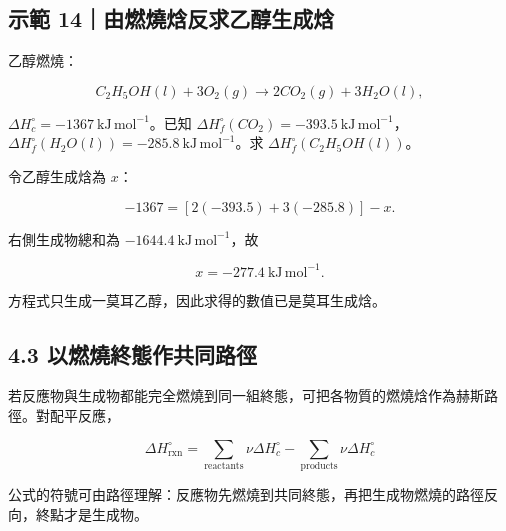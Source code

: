 \documentclass[11pt,a4paper]{article}
\begin{document}
\begin{HandoutWorkedExample}

\subsection{示範 14｜由燃燒焓反求乙醇生成焓}\label{ux793aux7bc4-14ux7531ux71c3ux71d2ux7113ux53cdux6c42ux4e59ux9187ux751fux6210ux7113}

乙醇燃燒：

\[
C_2H_5OH(l)+3O_2(g)\rightarrow2CO_2(g)+3H_2O(l),
\]

\(\Delta H_c^\circ=-1367\ \mathrm{kJ\,mol^{-1}}\)。已知 \(\Delta H_f^\circ(CO_2)=-393.5\ \mathrm{kJ\,mol^{-1}}\)，\(\Delta H_f^\circ(H_2O(l))=-285.8\ \mathrm{kJ\,mol^{-1}}\)。求 \(\Delta H_f^\circ(C_2H_5OH(l))\)。

令乙醇生成焓為 \(x\)：

\[
-1367=[2(-393.5)+3(-285.8)]-x.
\]

右側生成物總和為 \(-1644.4\ \mathrm{kJ\,mol^{-1}}\)，故

\[
x=-277.4\ \mathrm{kJ\,mol^{-1}}.
\]

方程式只生成一莫耳乙醇，因此求得的數值已是莫耳生成焓。

\end{HandoutWorkedExample}

\subsection{4.3 以燃燒終態作共同路徑}\label{ux4ee5ux71c3ux71d2ux7d42ux614bux4f5cux5171ux540cux8defux5f91}

若反應物與生成物都能完全燃燒到同一組終態，可把各物質的燃燒焓作為赫斯路徑。對配平反應，

\[
\boxed{
\Delta H_{\mathrm{rxn}}^\circ
=\sum_{\text{reactants}}\nu\Delta H_c^\circ
-\sum_{\text{products}}\nu\Delta H_c^\circ
}
\]

公式的符號可由路徑理解：反應物先燃燒到共同終態，再把生成物燃燒的路徑反向，終點才是生成物。
\end{document}

